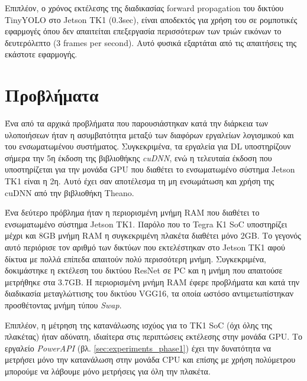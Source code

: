 Επιπλέον, ο χρόνος εκτέλεσης της διαδικασίας forward propagation του
δικτύου TinyYOLO στο Jetson TK1 (0.3sec), είναι αποδεκτός
για χρήση του σε ρομποτικές εφαρμογές όπου δεν απαιτείται επεξεργασία
περισσότερων των τριών εικόνων το δευτερόλεπτο (3 frames per second). Αυτό
φυσικά εξαρτάται από τις απαιτήσεις της εκάστοτε εφαρμογής.



\section{Προβλήματα}

Ένα από τα αρχικά προβλήματα που παρουσιάστηκαν κατά την διάρκεια των υλοποιήσεων
ήταν η ασυμβατότητα μεταξύ των διαφόρων εργαλείων λογισμικού και του
ενσωματωμένου συστήματος. Συγκεκριμένα, τα εργαλεία για DL υποστηρίζουν σήμερα την 5η έκδοση της βιβλιοθήκης
\emph{cuDNN}, ενώ η τελευταία έκδοση που υποστηρίζεται για την μονάδα GPU που διαθέτει
το ενσωματωμένο σύστημα Jetson TK1 είναι η 2η. Αυτό έχει σαν αποτέλεσμα
τη μη ενσωμάτωση και χρήση της cuDNN από την βιβλιοθήκη Theano.

Ένα δεύτερο πρόβλημα ήταν η περιορισμένη μνήμη RAM που διαθέτει το
ενσωματωμένο σύστημα Jetson TK1. Παρόλο που το Tegra K1 SoC υποστηρίζει
μέχρι και 8GB μνήμη RAM η συγκεκριμένη πλακέτα διαθέτει μόνο 2GB.
Το γεγονός αυτό περιόρισε τον αριθμό των δικτύων που εκτελέστηκαν στο Jetson TK1
αφού δίκτυα με πολλά επίπεδα απαιτούν πολύ περισσότερη μνήμη. Συγκεκριμένα,
δοκιμάστηκε η εκτέλεση του δικτύου
ResNet σε PC και η μνήμη που απαιτούσε μετρήθηκε στα 3.7GB.
Η περιορισμένη μνήμη RAM έφερε προβλήματα και κατά την διαδικασία μεταγλώττισης
του δικτύου VGG16, τα οποία ωστόσο αντιμετωπίστηκαν προσθέτοντας μνήμη τύπου \emph{Swap}.

Επιπλέον, η μέτρηση της κατανάλωσης ισχύος για το TK1 SoC (όχι όλης της πλακέτας)
ήταν αδύνατη, ιδιαίτερα στις περιπτώσεις εκτέλεσης στην μονάδα GPU.
Το εργαλείο \emph{PowerAPI} (βλ. \autoref{sec:experiments_phase1}) έχει την
δυνατότητα να μετρήσει μόνο την κατανάλωση στην μονάδα CPU και επίσης με χρήση πολύμετρου
μπορούμε να λάβουμε μόνο μετρήσεις για όλη την πλακέτα.
